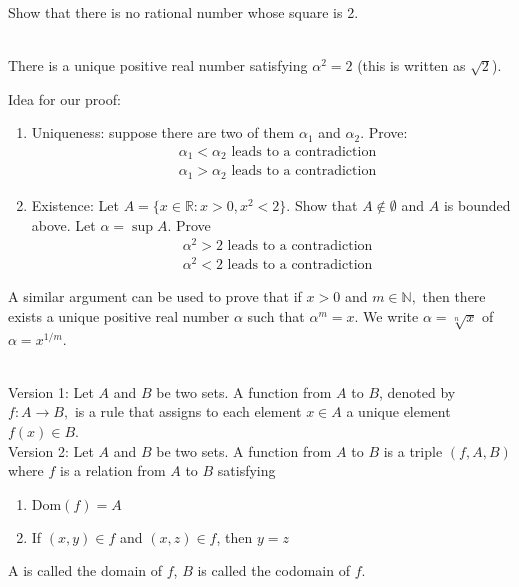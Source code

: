 \begin{example}
    Show that there is no rational number whose square is 2.
\end{example}

\begin{theorem} \leavevmode \\
    There is a unique positive real number satisfying $\alpha ^2 = 2$ (this is written as $\sqrt{2}$).
\end{theorem}

\begin{info}
    Idea for our proof:
    \begin{enumerate}[1.]
        \item Uniqueness: suppose there are two of them $\alpha_{1}$ and $\alpha_{2}$. Prove: 
        \begin{align*}
            &\alpha_1 < \alpha_2 \text{ leads to a contradiction} \\
            &\alpha_1 > \alpha_2 \text{ leads to a contradiction}
        \end{align*}
        \item Existence:
        Let $A=\{x\in\mathbb{R} : x > 0, x^2 <2\}.$ Show that $A\not \in \emptyset$ and $A$ is bounded above.
        Let $\alpha = \sup A$.
        Prove
        \begin{align*}
            &\alpha^2>2 \text{ leads to a contradiction}\\
            &\alpha^2<2 \text{ leads to a contradiction}
        \end{align*}
    \end{enumerate}
\end{info}

\begin{note}
    A similar argument can be used to prove that if $x>0$ and $m\in\mathbb{N},$ then there exists a unique positive real number $\alpha$ such that $\alpha^m=x.$ We write $\alpha=\sqrt[n]{x}$ of $\alpha = x^{1/m}$.
\end{note}

\begin{definition}[Function] \leavevmode \\
    Version 1: Let $A$ and $B$ be two sets. A function from $A$ to $B$, denoted by $f:A\rightarrow B,$ is a rule that assigns to each element $x\in A$ a unique element $f(x) \in B$. \\

    Version 2: Let $A$ and $B$ be two sets. A function from $A$ to $B$ is a triple $(f, A, B)$ where $f$ is a relation from $A$ to $B$ satisfying \begin{enumerate}[$(i)$]
        \item $\text{Dom} (f) = A$
        \item If $(x,y)\in f$ and $(x, z) \in f$, then $y=z$
    \end{enumerate}
    A is called the domain of $f$, $B$ is called the codomain of $f$.
\end{definition}

